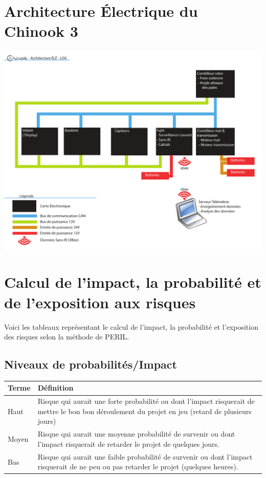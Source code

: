 \section{Architecture Électrique du Chinook 3}
\label{sec:archELE}
\includegraphics[height=1\textwidth,angle=90]{images/architecture-ele-log.pdf}

\clearpage
\section{Calcul de l'impact, la probabilité et de l'exposition aux risques}
\label{annexePERIL}
Voici les tableaux représentant le calcul de l'impact, la probabilité et l'exposition des risques selon la méthode de PERIL.

\subsection{Niveaux de probabilités/Impact}


\begin{tabu} to \linewidth {lX}
  \textbf{Terme} & \textbf{Définition} \\
  \hline
  Haut & Risque qui aurait une forte probabilité ou dont l'impact risquerait de mettre le bon bon déroulement du projet en jeu (retard de plusieurs jours) \\
  Moyen & Risque qui aurait une moyenne probabilité de survenir ou dont l'impact risquerait de retarder le projet de quelques jours.\\
  Bas & Risque qui aurait une faible probabilité de survenir ou dont l'impact risquerait de ne peu ou pas retarder le projet (quelques heures). 
\end{tabu}

